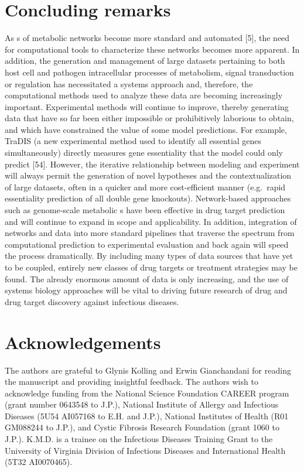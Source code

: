 \section{Concluding remarks}
As s of metabolic networks become more standard 
and automated [5], the need for computational tools to characterize 
these networks becomes more apparent. In addition, the generation 
and management of large datasets pertaining to both host cell 
and pathogen intracellular processes of metabolism, signal 
transduction or regulation has necessitated a systems approach 
and, therefore, the computational methods used to analyze 
these data are becoming increasingly important. 
Experimental methods will continue to improve, thereby 
generating data that have so far been either impossible 
or prohibitively laborious to obtain, and which have 
constrained the value of some model predictions. For 
example, TraDIS (a new experimental method used to 
identify all essential genes simultaneously) directly 
measures gene essentiality that the model could only 
predict [54]. However, the iterative relationship between 
modeling and experiment will always permit the generation 
of novel hypotheses and the contextualization of large 
datasets, often in a quicker and more cost-efficient 
manner (e.g.\ rapid essentiality prediction of all double 
gene knockouts). Network-based approaches such as 
genome-scale metabolic s have been effective 
in drug target prediction and will continue to expand 
in scope and applicability. In addition, integration 
of networks and data into more standard pipelines that 
traverse the spectrum from computational prediction to 
experimental evaluation and back again will speed the 
process dramatically. By including many types of data 
sources that have yet to be coupled, entirely new classes 
of drug targets or treatment strategies may be found. The 
already enormous amount of data is only increasing, and the 
use of systems biology approaches will be vital to driving 
future research of drug and drug target discovery against 
infectious diseases.

\section{Acknowledgements}
The authors are grateful to Glynis Kolling and Erwin 
Gianchandani for reading the manuscript and providing 
insightful feedback. The authors wish to acknowledge 
funding from the National Science Foundation CAREER program 
(grant number 0643548 to J.P.), National Institute of 
Allergy and Infectious Diseases (5U54 AI057168 to E.H. and J.P.), 
National Institutes of Health (R01 GM088244 to J.P.), and 
Cystic Fibrosis Research Foundation (grant 1060 to J.P.). 
K.M.D. is a trainee on the Infectious Diseases Training 
Grant to the University of Virginia Division of Infectious 
Diseases and International Health (5T32 AI0070465).

